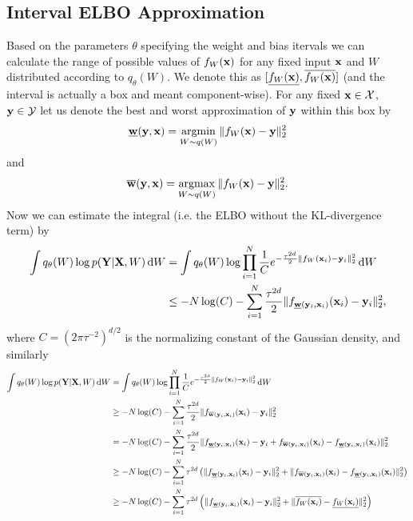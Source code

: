 \documentclass[10pt, a4paper]{article}
\begin{document}
\subsection{Interval ELBO Approximation}\label{sec:interval_elbo}
Based on the parameters $\theta$ specifying the weight and bias itervals we can calculate the range of possible values of $f_W(\mathbf{x})$ for any fixed input $\mathbf{x}$ and $W$ distributed according to $q_\theta(W)$. We denote this as $[\underline{f_W(\mathbf{x})}, \overline{f_W(\mathbf{x})}]$ (and the interval is actually a box and meant component-wise). For any fixed $\mathbf{x}\in\mathcal{X}$, $\mathbf{y}\in\mathcal{Y}$ let us denote the best and worst approximation of $\mathbf{y}$ within this box by
\[\underline{\mathbf{w}}(\mathbf{y},\mathbf{x}) = \operatorname*{argmin}_{W\sim q(W)} \|f_W(\mathbf{x}) - \mathbf{y} \|_2^2\]
and
\[\overline{\mathbf{w}}(\mathbf{y},\mathbf{x}) = \operatorname*{argmax}_{W\sim q(W)} \|f_W(\mathbf{x}) - \mathbf{y} \|_2^2.\]
Now we can estimate the integral (i.e. the ELBO without the KL-divergence term) by
\begin{align*}
    \int q_\theta(W) \log p(\mathbf{Y}\vert \mathbf{X}, W)\,\mathrm{d} W &= \int q_\theta(W) \log \prod_{i=1}^N \frac{1}{C} e^{-\frac{\tau^{2d}}{2}\|f_W(\mathbf{x}_i)-\mathbf{y}_i\|_2^2} \,\mathrm{d} W \\
    &\leq -N\log(C) - \sum_{i=1}^N \frac{\tau^{2d}}{2}\|f_{\underline{\mathbf{w}}(\mathbf{y}_i,\mathbf{x}_i)}(\mathbf{x}_i)-\mathbf{y}_i\|_2^2,
\end{align*}
where $C=(2\pi \tau^{-2})^{d/2}$ is the normalizing constant of the Gaussian density, and similarly
\begin{align*}
    \int q_\theta(W) \log p(\mathbf{Y}\vert \mathbf{X}, W)\,\mathrm{d} W &= \int q_\theta(W) \log \prod_{i=1}^N \frac{1}{C} e^{-\frac{\tau^{2d}}{2}\|f_W(\mathbf{x}_i)-\mathbf{y}_i\|_2^2} \,\mathrm{d} W \\
    &\geq -N\log(C) - \sum_{i=1}^N \frac{\tau^{2d}}{2}\|f_{\overline{\mathbf{w}}(\mathbf{y}_i,\mathbf{x}_i)}(\mathbf{x}_i)-\mathbf{y}_i\|_2^2 \\
    &=  -N\log(C) - \sum_{i=1}^N \frac{\tau^{2d}}{2}\|f_{\underline{\mathbf{w}}(\mathbf{y}_i,\mathbf{x}_i)}(\mathbf{x}_i) -  \mathbf{y}_i + f_{\overline{\mathbf{w}}(\mathbf{y}_i,\mathbf{x}_i)}(\mathbf{x}_i) - f_{\underline{\mathbf{w}}(\mathbf{y}_i,\mathbf{x}_i)}(\mathbf{x}_i)\|_2^2 \\
    &\geq -N\log(C) - \sum_{i=1}^N \tau^{2d} \left( \|f_{\underline{\mathbf{w}}(\mathbf{y}_i,\mathbf{x}_i)}(\mathbf{x}_i)-\mathbf{y}_i\|_2^2 + \|f_{\overline{\mathbf{w}}(\mathbf{y}_i,\mathbf{x}_i)}(\mathbf{x}_i)-f_{\underline{\mathbf{w}}(\mathbf{y}_i,\mathbf{x}_i)}(\mathbf{x}_i)\|_2^2 \right) \\
    & \geq -N\log(C) - \sum_{i=1}^N \tau^{2d}\left(\|f_{\underline{\mathbf{w}}(\mathbf{y}_i,\mathbf{x}_i)}(\mathbf{x}_i)-\mathbf{y}_i\|_2^2 + \|\overline{f_W(\mathbf{x}_i)}-\underline{f_W(\mathbf{x}_i)}\|_2^2 \right)
\end{align*}
\end{document}
